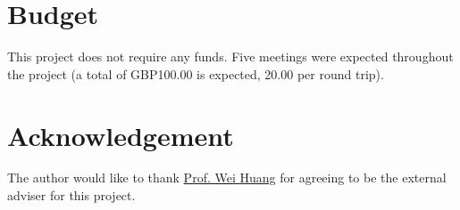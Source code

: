 \documentclass[a4paper, 11pt]{article}
\begin{document}
\section{Budget}
This project does not require any funds.  Five meetings were expected throughout the project (a total of GBP100.00 is expected, 20.00 per round trip).
\clearpage
\section*{Acknowledgement}
The author would like to thank \href{mailto:wei.huang@eng.ox.ac.uk}{Prof. Wei Huang} for agreeing to be the external adviser for this project.
\nocite{*}\printbibliography
\end{document}
